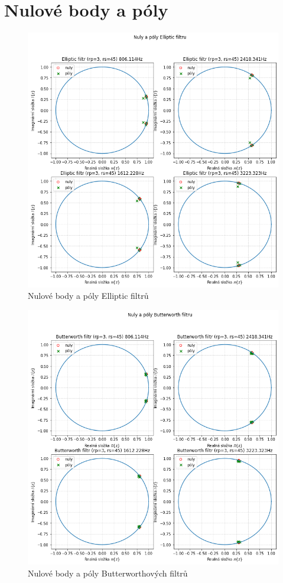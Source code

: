 \documentclass{article}
\begin{document}
\section{Nulové body a póly}
\begin{figure}[H] 
	\centering
	\includegraphics[scale=0.65,keepaspectratio]{Figure_19}
	\caption{Nulové body a póly Elliptic filtrů}
\end{figure}

\begin{figure}[H] 
	\centering
	\includegraphics[scale=0.65,keepaspectratio]{Figure_18}
	\caption{Nulové body a póly Butterworthových filtrů}
\end{figure}
\end{document}
